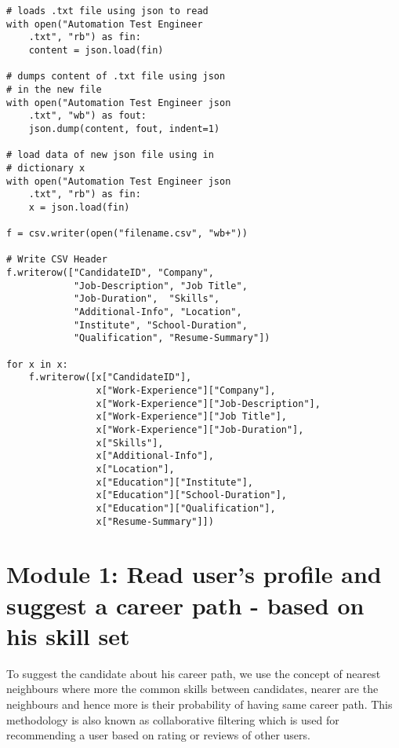 \documentclass[conference]{IEEEtran}
\begin{document}
\lstset{basicstyle=\small,style=myCustomMatlabStyle}

\begin{lstlisting}
# loads .txt file using json to read
with open("Automation Test Engineer
    .txt", "rb") as fin:
    content = json.load(fin)

# dumps content of .txt file using json 
# in the new file
with open("Automation Test Engineer json
    .txt", "wb") as fout:
    json.dump(content, fout, indent=1)

# load data of new json file using in 
# dictionary x
with open("Automation Test Engineer json
    .txt", "rb") as fin:
	x = json.load(fin)
	
f = csv.writer(open("filename.csv", "wb+"))

# Write CSV Header
f.writerow(["CandidateID", "Company",
            "Job-Description", "Job Title",
            "Job-Duration",  "Skills",
            "Additional-Info", "Location",
            "Institute", "School-Duration",
            "Qualification", "Resume-Summary"])

for x in x:
    f.writerow([x["CandidateID"],
                x["Work-Experience"]["Company"],
                x["Work-Experience"]["Job-Description"],
                x["Work-Experience"]["Job Title"],
                x["Work-Experience"]["Job-Duration"],
                x["Skills"],
                x["Additional-Info"],
                x["Location"],
                x["Education"]["Institute"],
                x["Education"]["School-Duration"],
                x["Education"]["Qualification"],
                x["Resume-Summary"]])

\end{lstlisting}

\section{Module 1: Read user's profile and suggest a career path - based on his skill set}
To suggest the candidate about his career path, we use the concept of nearest neighbours where more the common skills between candidates, nearer are the neighbours and hence more is their probability of having same career path. This methodology is also known as collaborative filtering which is used for recommending a user based on rating or reviews of other users. 
\end{document}
